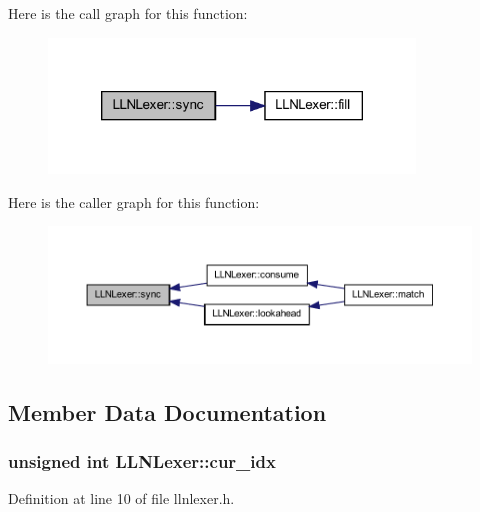 Here is the call graph for this function:
\nopagebreak
\begin{figure}[H]
\begin{center}
\leavevmode
\includegraphics[width=276pt]{class_l_l_n_lexer_a63acbcfa3e703992774a6071a49d1735_cgraph}
\end{center}
\end{figure}




Here is the caller graph for this function:
\nopagebreak
\begin{figure}[H]
\begin{center}
\leavevmode
\includegraphics[width=400pt]{class_l_l_n_lexer_a63acbcfa3e703992774a6071a49d1735_icgraph}
\end{center}
\end{figure}




\subsection{Member Data Documentation}
\hypertarget{class_l_l_n_lexer_a6cac67fbdbdc8083f87e1d0938d68ba2}{
\subsubsection[{cur\_\-idx}]{\setlength{\rightskip}{0pt plus 5cm}unsigned int {\bf LLNLexer::cur\_\-idx}}}
\label{class_l_l_n_lexer_a6cac67fbdbdc8083f87e1d0938d68ba2}


Definition at line 10 of file llnlexer.h.

